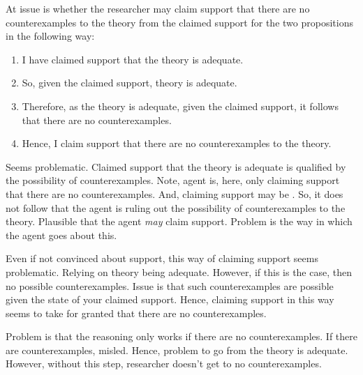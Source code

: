 \begin{note}
\begin{illustration}
    At issue is whether the researcher may claim support that there are no counterexamples to the theory from the claimed support for the two propositions in the following way:

    \begin{enumerate}
    \item I have claimed support that the theory is adequate.
    \item So, given the claimed support, theory is adequate.
    \item Therefore, as the theory is adequate, given the claimed support, it follows that there are no counterexamples.
    \item Hence, I claim support that there are no counterexamples to the theory.
    \end{enumerate}
    \vspace{-\baselineskip}
  \end{illustration}
\end{note}

\begin{note}
  Seems problematic.
  Claimed support that the theory is adequate is qualified by the possibility of counterexamples.
  {
    \color{red}
    Note, agent is, here, only claiming support that there are no counterexamples.
    And, claiming support may be \mom{}.
    So, it does not follow that the agent is ruling out the possibility of counterexamples to the theory.
    Plausible that the agent \emph{may} claim support.
    Problem is the way in which the agent goes about this.
  }

  {
    Even if not convinced about support, this way of claiming support seems problematic.
    Relying on theory being adequate.
    However, if this is the case, then no possible counterexamples.
    Issue is that such counterexamples are possible given the state of your claimed support.
    Hence, claiming support in this way seems to take for granted that there are no counterexamples.
  }

  Problem is that the reasoning only works if there are no counterexamples.
  If there are counterexamples, misled.
  Hence, problem to go from the theory is adequate.
  However, without this step, researcher doesn't get to no counterexamples.
\end{note}

